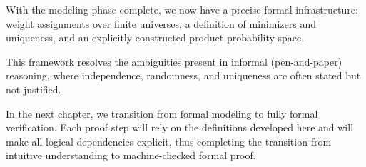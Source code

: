 With the modeling phase complete, we now have a precise formal infrastructure: weight assignments over finite universes, a definition of minimizers and uniqueness, and an explicitly constructed product probability space.

This framework resolves the ambiguities present in informal (pen-and-paper) reasoning, where independence, randomness, and uniqueness are often stated but not justified.

In the next chapter, we transition from formal modeling to fully formal verification.
Each proof step will rely on the definitions developed here and will make all logical dependencies explicit, thus completing the transition from intuitive understanding to machine-checked formal proof.
